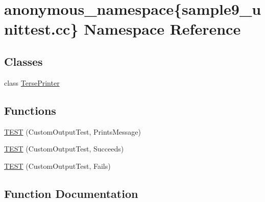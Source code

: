 \hypertarget{namespaceanonymous__namespace_02sample9__unittest_8cc_03}{}\section{anonymous\+\_\+namespace\{sample9\+\_\+unittest.\+cc\} Namespace Reference}
\label{namespaceanonymous__namespace_02sample9__unittest_8cc_03}
\subsection*{Classes}
\begin{DoxyCompactItemize}
\item 
class \hyperlink{classanonymous__namespace_02sample9__unittest_8cc_03_1_1TersePrinter}{Terse\+Printer}
\end{DoxyCompactItemize}
\subsection*{Functions}
\begin{DoxyCompactItemize}
\item 
\hyperlink{namespaceanonymous__namespace_02sample9__unittest_8cc_03_aeba18a5ebdd3c93b98ef5e96fdb608cf}{T\+E\+ST} (Custom\+Output\+Test, Prints\+Message)
\item 
\hyperlink{namespaceanonymous__namespace_02sample9__unittest_8cc_03_aa945da85de673d799587ce52ce590af2}{T\+E\+ST} (Custom\+Output\+Test, Succeeds)
\item 
\hyperlink{namespaceanonymous__namespace_02sample9__unittest_8cc_03_a3506d8abcde9c893d260ea1fb4370460}{T\+E\+ST} (Custom\+Output\+Test, Fails)
\end{DoxyCompactItemize}


\subsection{Function Documentation}
\mbox{\label{namespaceanonymous__namespace_02sample9__unittest_8cc_03_aeba18a5ebdd3c93b98ef5e96fdb608cf}} 
